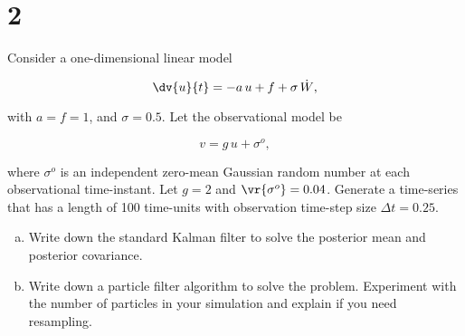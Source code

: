 \section{2}

Consider a one-dimensional linear model

\begin{equation}
	\dv{u}{t} = -a\,u + f + \sigma\,\dot{W},
\end{equation}

with $a = f = 1$, and $\sigma = 0.5$. Let the observational model be

\begin{equation}
	v = g\,u + \sigma^{o},
\end{equation}

where $\sigma^{o}$ is an independent zero-mean Gaussian random number at each observational time-instant. Let $g = 2$ and $\vr{\sigma^{o}} = 0.04$. Generate a time-series that has a length of 100 time-units with observation time-step size $\Delta t = 0.25$.

\begin{enumerate}[a)]
	\item Write down the standard Kalman filter to solve the posterior mean and posterior covariance.
	
	\item Write down a particle filter algorithm to solve the problem. Experiment with the number of particles in your simulation and explain if you need resampling.
\end{enumerate}
